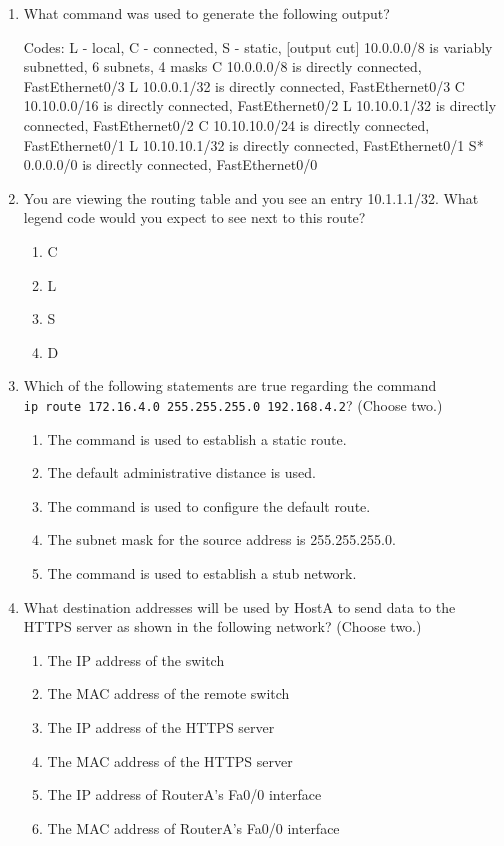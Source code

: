 \begin{enumerate}
\item
  What command was used to generate the following output?

\begin{cli}
Codes: L - local, C - connected, S - static,
[output cut]
        10.0.0.0/8 is variably subnetted, 6 subnets, 4 masks
C       10.0.0.0/8 is directly connected, FastEthernet0/3
L       10.0.0.1/32 is directly connected, FastEthernet0/3
C       10.10.0.0/16 is directly connected, FastEthernet0/2
L       10.10.0.1/32 is directly connected, FastEthernet0/2
C       10.10.10.0/24 is directly connected, FastEthernet0/1
L       10.10.10.1/32 is directly connected, FastEthernet0/1
S*      0.0.0.0/0 is directly connected, FastEthernet0/0
\end{cli}
\item
  You are viewing the routing table and you see an entry 10.1.1.1/32.
  What legend code would you expect to see next to this route?

  \begin{enumerate}
  \item
    C
  \item
    L
  \item
    S
  \item
    D
  \end{enumerate}
\item
  Which of the following statements are true regarding the command
  \texttt{ip\ route\ 172.16.4.0\ 255.255.255.0\ 192.168.4.2}? (Choose
  two.)

  \begin{enumerate}
  \item
    The command is used to establish a static route.
  \item
    The default administrative distance is used.
  \item
    The command is used to configure the default route.
  \item
    The subnet mask for the source address is 255.255.255.0.
  \item
    The command is used to establish a stub network.
  \end{enumerate}
\item
  What destination addresses will be used by HostA to send data to the
  HTTPS server as shown in the following network? (Choose two.)

  \begin{enumerate}
  \item
    The IP address of the switch
  \item
    The MAC address of the remote switch
  \item
    The IP address of the HTTPS server
  \item
    \protect\hypertarget{c09.xhtmlux5cux23Page_406}{}{}The MAC address
    of the HTTPS server
  \item
    The IP address of RouterA's Fa0/0 interface
  \item
    The MAC address of RouterA's Fa0/0 interface


\end{enumerate}
\end{enumerate}
